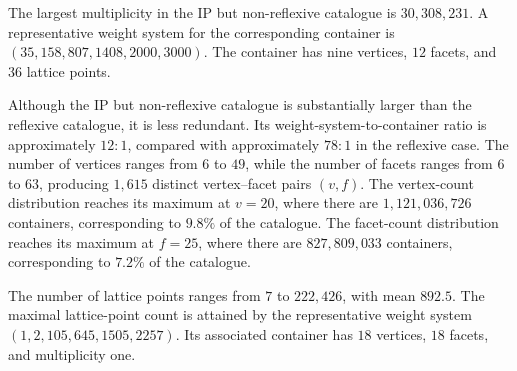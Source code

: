 \documentclass[appliedmath,article,submit,moreauthors]{Definitions/mdpi}
\begin{document}
The largest multiplicity in the IP but non-reflexive catalogue is
\(30{,}308{,}231\). A representative weight system for the corresponding
container is \((35,158,807,1408,2000,3000)\). The container has nine vertices,
\(12\) facets, and \(36\) lattice points.

Although the IP but non-reflexive catalogue is substantially larger than the
reflexive catalogue, it is less redundant. Its weight-system-to-container ratio
is approximately \(12:1\), compared with approximately \(78:1\) in the reflexive
case. The number of vertices ranges from \(6\) to \(49\), while the number of
facets ranges from \(6\) to \(63\), producing \(1{,}615\) distinct vertex--facet
pairs \((v,f)\). The vertex-count distribution reaches its maximum at \(v=20\),
where there are \(1{,}121{,}036{,}726\) containers, corresponding to \(9.8\%\)
of the catalogue. The facet-count distribution reaches its maximum at \(f=25\),
where there are \(827{,}809{,}033\) containers, corresponding to \(7.2\%\) of
the catalogue.

The number of lattice points ranges from \(7\) to \(222{,}426\), with mean
\(892.5\). The maximal lattice-point count is attained by the representative
weight system \((1,2,105,645,1505,2257)\). Its associated container has \(18\)
vertices, \(18\) facets, and multiplicity one.
\end{document}
